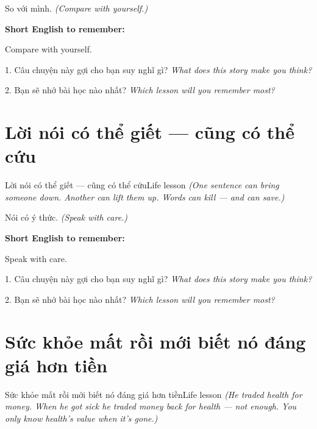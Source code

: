 \begin{baihoc}
So với mình.
\textit{(Compare with yourself.)}
\end{baihoc}

\begin{ghinhoanh}
\textbf{Short English to remember:}

Compare with yourself.

\end{ghinhoanh}

\begin{tuhocnhanh}
1. Câu chuyện này gợi cho bạn suy nghĩ gì? \textit{What does this story make you think?}

2. Bạn sẽ nhớ bài học nào nhất? \textit{Which lesson will you remember most?}
\end{tuhocnhanh}
\ngancach


\section{Lời nói có thể giết — cũng có thể cứu}
\begin{truyen}{Lời nói có thể giết — cũng có thể cứu}{Life lesson}
\textit{(One sentence can bring someone down. Another can lift them up. Words can kill — and can save.)}
\end{truyen}

\begin{baihoc}
Nói có ý thức.
\textit{(Speak with care.)}
\end{baihoc}

\begin{ghinhoanh}
\textbf{Short English to remember:}

Speak with care.

\end{ghinhoanh}

\begin{tuhocnhanh}
1. Câu chuyện này gợi cho bạn suy nghĩ gì? \textit{What does this story make you think?}

2. Bạn sẽ nhớ bài học nào nhất? \textit{Which lesson will you remember most?}
\end{tuhocnhanh}
\ngancach


\section{Sức khỏe mất rồi mới biết nó đáng giá hơn tiền}
\begin{truyen}{Sức khỏe mất rồi mới biết nó đáng giá hơn tiền}{Life lesson}
\textit{(He traded health for money. When he got sick he traded money back for health — not enough. You only know health's value when it's gone.)}
\end{truyen}

